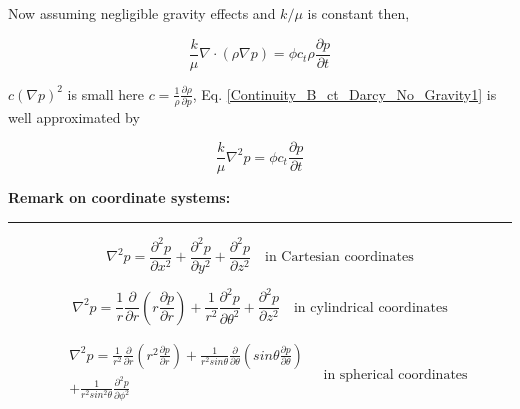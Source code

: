 \documentclass{llncs}
\numberwithin{equation}{section}
\numberwithin{figure}{section}
\numberwithin{table}{section}
\begin{document}
    Now assuming negligible gravity effects and $k/\mu$ is constant then,

    \begin{equation}
        \frac{k}{\mu }\nabla \cdot \left( \rho \nabla p \right)=\phi {{c}_{t}}\rho \frac{\partial p}{\partial t}
    \label{Continuity_B_ct_Darcy_No_Gravity1}
    \end{equation}

     $c{{\left( \nabla p \right)}^{2}}$ is small here $c=\frac{1}{\rho }\frac{\partial \rho }{\partial p}$, Eq. \ref{Continuity_B_ct_Darcy_No_Gravity1} is well approximated by

    \begin{equation}
        \frac{k}{\mu }{{\nabla }^{2}}p=\phi {{c}_{t}}\frac{\partial p}{\partial t}
    \label{Continuity_B_ct_Darcy_No_Gravity1_approx}
    \end{equation}

    \vspace{15pt}
    \large{\textbf{Remark on coordinate systems:}}\\
    \rule{\textwidth}{1pt}

    \begin{equation*}
        {{\nabla }^{2}}p=\frac{{{\partial }^{2}}p}{\partial {{x}^{2}}}+\frac{{{\partial }^{2}}p}{\partial {{y}^{2}}}+\frac{{{\partial }^{2}}p}{\partial {{z}^{2}}}\quad \text{in Cartesian coordinates}
    \label{Laplacian_Cartesian}
    \end{equation*}

    \begin{equation*}
        {{\nabla }^{2}}p=\frac{1}{r}\frac{\partial }{\partial r}\left( r\frac{\partial p}{\partial r} \right)+\frac{1}{{{r}^{2}}}\frac{{{\partial }^{2}}p}{\partial {{\theta }^{2}}}+\frac{{{\partial }^{2}}p}{\partial {{z}^{2}}}\quad \text{in cylindrical coordinates}
    \label{Laplacian_Cylindrical}
    \end{equation*}

    \begin{equation*}
        \begin{split}
    & {{\nabla }^{2}}p=\frac{1}{{{r}^{2}}}\frac{\partial }{\partial r}\left( {{r}^{2}}\frac{\partial p}{\partial r} \right)+\frac{1}{{{r}^{2}}sin\theta }\frac{\partial }{\partial \theta }\left( sin\theta \frac{\partial p}{\partial \theta } \right) \\
    & +\frac{1}{{{r}^{2}}si{{n}^{2}}\theta }\frac{{{\partial }^{2}}p}{\partial {{\phi }^{2}}} \\
    \end{split}\quad \text{in spherical coordinates}
    \label{Laplacian_Spherical}
    \end{equation*}
\end{document}
